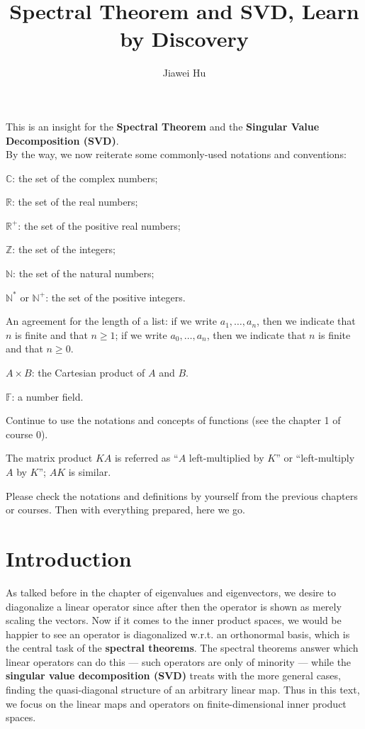 \documentclass{article}
\title{\LARGE \textbf{Spectral Theorem and SVD, Learn by Discovery}}
\author{\large Jiawei Hu}
\begin{document}
\maketitle
\tableofcontents
\newpage

This is an insight for the \textbf{Spectral Theorem} and the \textbf{Singular Value Decomposition (SVD)}. \\ 
By the way, we now reiterate some commonly-used notations and conventions:
\begin{compactenum}
    \item $\mathbb{C}$: the set of the complex numbers;
    \item $\mathbb{R}$: the set of the real numbers;
    \item $\mathbb{R}^+$: the set of the positive real numbers;
    \item $\mathbb{Z}$: the set of the integers;
    \item $\mathbb{N}$: the set of the natural numbers;
    \item $\mathbb{N^\ast}$ or $\mathbb{N}^+$: the set of the positive integers.
    \item An agreement for the length of a list: if we write $a_1, \dots, a_n$, then we indicate that $n$ is finite and that $n\geq 1$; if we write $a_0, \dots, a_n$, then we indicate that $n$ is finite and that $n\geq 0$.
    \item $A\times B$: the Cartesian product of $A$ and $B$.
    \item $\mathbb{F}$: a number field.
    \item Continue to use the notations and concepts of functions (see the chapter 1 of course 0).
    \item The matrix product $KA$ is referred as ``$A$ left-multiplied by $K$'' or ``left-multiply $A$ by $K$''; $AK$ is similar.
\end{compactenum} 
Please check the notations and definitions by yourself from the previous chapters or courses. Then with everything prepared, here we go.

\section{Introduction}
As talked before in the chapter of eigenvalues and eigenvectors, we desire to diagonalize a linear operator since after then the operator is shown as merely scaling the vectors. Now if it comes to the inner product spaces, we would be happier to see an operator is diagonalized w.r.t. an orthonormal basis, which is the central task of the \textbf{spectral theorems}. The spectral theorems answer which linear operators can do this — such operators are only of minority — while the \textbf{singular value decomposition (SVD)} treats with the more general cases, finding the quasi-diagonal structure of an arbitrary linear map. Thus in this text, we focus on the linear maps and operators on finite-dimensional inner product spaces.
\end{document}
